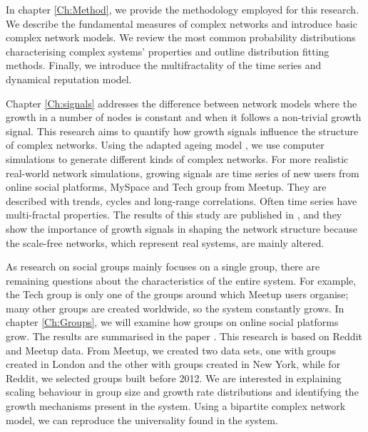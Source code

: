 In chapter \ref{Ch:Method}, we provide the methodology employed for this research. We describe the fundamental measures of complex networks and introduce basic complex network models. We review the most common probability distributions characterising complex systems' properties and outline distribution fitting methods. Finally, we introduce the multifractality of the time series and dynamical reputation model. 

Chapter \ref{Ch:signals} addresses the difference between network models where the growth in a number of nodes is constant and when it follows a non-trivial growth signal. This research aims to quantify how growth signals influence the structure of complex networks. Using the adapted ageing model \cite{hajra2004}, we use computer simulations to generate different kinds of complex networks. For more realistic real-world network simulations, growing signals are time series of new users from online social platforms, MySpace and Tech group from Meetup. They are described with trends, cycles and long-range correlations. Often time series have multi-fractal properties. The results of this study are published in \cite{vranic2021growth}, and they show the importance of growth signals in shaping the network structure because the scale-free networks, which represent real systems, are mainly altered. 

As research on social groups mainly focuses on a single group, there are remaining questions about the characteristics of the entire system. For example, the Tech group is only one of the groups around which Meetup users organise; many other groups are created worldwide, so the system constantly grows. In chapter \ref{Ch:Groups}, we will examine how groups on online social platforms grow. The results are summarised in the paper  \cite{vranic2022universal}. This research is based on Reddit and Meetup data. From Meetup, we created two data sets, one with groups created in London and the other with groups created in New York, while for Reddit, we selected groups built before 2012. We are interested in explaining scaling behaviour in group size and growth rate distributions and identifying the growth mechanisms present in the system. Using a bipartite complex network model, we can reproduce the universality found in the system.

